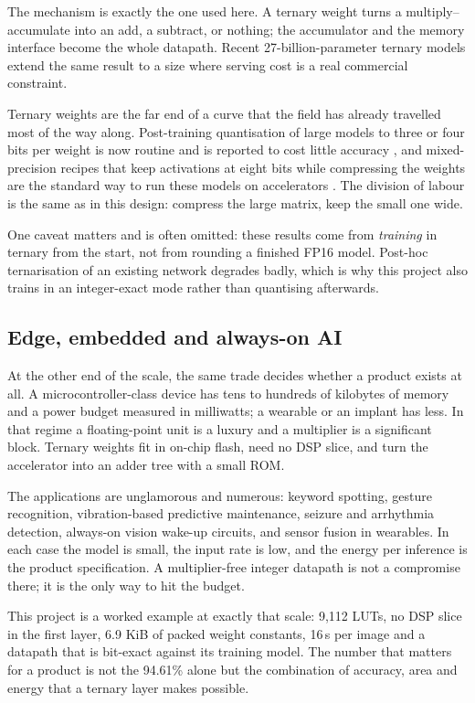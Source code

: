 \documentclass[11pt,a4paper]{article}
\begin{document}
The mechanism is exactly the one used here. A ternary weight turns a
multiply--accumulate into an add, a subtract, or nothing; the accumulator and
the memory interface become the whole datapath. Recent 27-billion-parameter
ternary models extend the same result to a size where serving cost is a real
commercial constraint.

Ternary weights are the far end of a curve that the field has already travelled
most of the way along. Post-training quantisation of large models to three or
four bits per weight is now routine and is reported to cost little accuracy
\cite{frantar2022gptq}, and mixed-precision recipes that keep activations at
eight bits while compressing the weights are the standard way to run these
models on accelerators \cite{hoefler2021fast}. The division of labour is the
same as in this design: compress the large matrix, keep the small one wide.

One caveat matters and is often omitted: these results come from \emph{training}
in ternary from the start, not from rounding a finished FP16 model. Post-hoc
ternarisation of an existing network degrades badly, which is why this project
also trains in an integer-exact mode rather than quantising afterwards.

\subsection{Edge, embedded and always-on AI}

At the other end of the scale, the same trade decides whether a product exists
at all. A microcontroller-class device has tens to hundreds of kilobytes of
memory and a power budget measured in milliwatts; a wearable or an implant has
less. In that regime a floating-point unit is a luxury and a multiplier is a
significant block. Ternary weights fit in on-chip flash, need no DSP slice, and
turn the accelerator into an adder tree with a small ROM.

The applications are unglamorous and numerous: keyword spotting, gesture
recognition, vibration-based predictive maintenance, seizure and arrhythmia
detection, always-on vision wake-up circuits, and sensor fusion in wearables.
In each case the model is small, the input rate is low, and the energy per
inference is the product specification. A multiplier-free integer datapath is
not a compromise there; it is the only way to hit the budget.

This project is a worked example at exactly that scale: 9{,}112 LUTs, no DSP
slice in the first layer, 6.9 KiB of packed weight constants, 16\,\textmu s per image and a
datapath that is bit-exact against its training model. The number that matters
for a product is not the 94.61\% alone but the combination of accuracy, area and
energy that a ternary layer makes possible.
\end{document}
